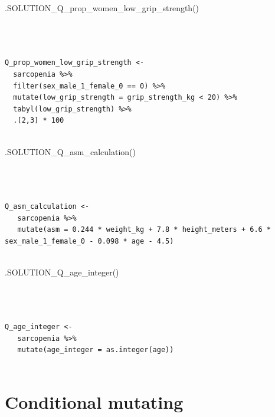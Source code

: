 \documentclass[
  letterpaper,
  DIV=11,
  numbers=noendperiod]{scrreprt}
\newenvironment{Shaded}{\begin{snugshade}}{\end{snugshade}}
\newcommand{\FunctionTok}[1]{\textcolor[rgb]{0.28,0.35,0.67}{#1}}
\newcommand{\NormalTok}[1]{\textcolor[rgb]{0.00,0.23,0.31}{#1}}
\begin{document}
\begin{Shaded}
\begin{Highlighting}[]
\FunctionTok{.SOLUTION\_Q\_prop\_women\_low\_grip\_strength}\NormalTok{()}
\end{Highlighting}
\end{Shaded}

\begin{verbatim}



Q_prop_women_low_grip_strength <- 
  sarcopenia %>% 
  filter(sex_male_1_female_0 == 0) %>% 
  mutate(low_grip_strength = grip_strength_kg < 20) %>% 
  tabyl(low_grip_strength) %>% 
  .[2,3] * 100
  
\end{verbatim}

\begin{Shaded}
\begin{Highlighting}[]
\FunctionTok{.SOLUTION\_Q\_asm\_calculation}\NormalTok{()}
\end{Highlighting}
\end{Shaded}

\begin{verbatim}



Q_asm_calculation <-
   sarcopenia %>%
   mutate(asm = 0.244 * weight_kg + 7.8 * height_meters + 6.6 * sex_male_1_female_0 - 0.098 * age - 4.5)
  
\end{verbatim}

\begin{Shaded}
\begin{Highlighting}[]
\FunctionTok{.SOLUTION\_Q\_age\_integer}\NormalTok{()}
\end{Highlighting}
\end{Shaded}

\begin{verbatim}



Q_age_integer <-
   sarcopenia %>%
   mutate(age_integer = as.integer(age))
  
\end{verbatim}


\hypertarget{conditional-mutating}{%
\chapter{Conditional mutating}\label{conditional-mutating}}
\end{document}
